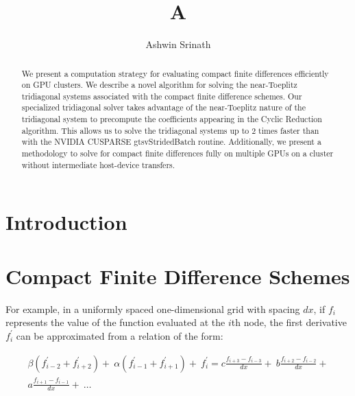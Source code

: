 \documentclass{elsarticle}
\begin{document}
\begin{frontmatter}
\author{Ashwin Srinath}
\title{A}
\maketitle

\begin{abstract}
    We present a computation strategy for evaluating
    compact finite differences efficiently on GPU clusters.
    We describe a novel algorithm for solving the
    near-Toeplitz tridiagonal systems associated with
    the compact finite difference schemes.
    Our specialized tridiagonal solver
    takes advantage of the near-Toeplitz nature of the
    tridiagonal system to precompute the coefficients
    appearing in the Cyclic Reduction algorithm.
    This allows us to solve the tridiagonal systems
    up to 2 times faster than with the NVIDIA CUSPARSE
    gtsvStridedBatch routine.
    Additionally, we present a methodology to solve for
    compact finite differences fully on multiple GPUs on a cluster
    without intermediate host-device transfers.
\end{abstract}

\end{frontmatter}
    
\section{Introduction}
      
\section{Compact Finite Difference Schemes}

For example,
in a uniformly spaced one-dimensional grid with spacing $dx$,
if $f_i$ represents the value of
the function evaluated at the $i$th node,
the first derivative $f^{\prime}_i$ can be approximated from
a relation of the form:

\begin{equation}
\begin{split}
    \beta(f^{\prime}_{i-2} + f^{\prime}_{i+2}) + \
    \alpha(f^{\prime}_{i-1} + f^{\prime}_{i+1}) + \
        f^{\prime}_i
    = 
    c\frac{f_{i+3} - f_{i-3}}{dx} + \
    b\frac{f_{i+2} - f_{i-2}}{dx} + \\
    a\frac{f_{i+1} - f_{i-1}}{dx} + \
    \hdots
\end{split}
\label{eqn:general-compact}
\end{equation}
\end{document}

